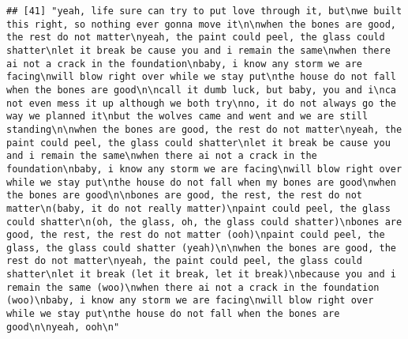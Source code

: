\documentclass[]{article}
\begin{document}
\begin{verbatim}
## [41] "yeah, life sure can try to put love through it, but\nwe built this right, so nothing ever gonna move it\n\nwhen the bones are good, the rest do not matter\nyeah, the paint could peel, the glass could shatter\nlet it break be cause you and i remain the same\nwhen there ai not a crack in the foundation\nbaby, i know any storm we are facing\nwill blow right over while we stay put\nthe house do not fall when the bones are good\n\ncall it dumb luck, but baby, you and i\nca not even mess it up although we both try\nno, it do not always go the way we planned it\nbut the wolves came and went and we are still standing\n\nwhen the bones are good, the rest do not matter\nyeah, the paint could peel, the glass could shatter\nlet it break be cause you and i remain the same\nwhen there ai not a crack in the foundation\nbaby, i know any storm we are facing\nwill blow right over while we stay put\nthe house do not fall when my bones are good\nwhen the bones are good\n\nbones are good, the rest, the rest do not matter\n(baby, it do not really matter)\npaint could peel, the glass could shatter\n(oh, the glass, oh, the glass could shatter)\nbones are good, the rest, the rest do not matter (ooh)\npaint could peel, the glass, the glass could shatter (yeah)\n\nwhen the bones are good, the rest do not matter\nyeah, the paint could peel, the glass could shatter\nlet it break (let it break, let it break)\nbecause you and i remain the same (woo)\nwhen there ai not a crack in the foundation (woo)\nbaby, i know any storm we are facing\nwill blow right over while we stay put\nthe house do not fall when the bones are good\n\nyeah, ooh\n"                                                                                                                                                                                                                                                                                                                                                                                                                                                                                                                                                                                                                                                                                                                                                                                                                                                                                                                                                                                                                                                                                                                                                                                                                                                                                

\end{verbatim}
\end{document}
